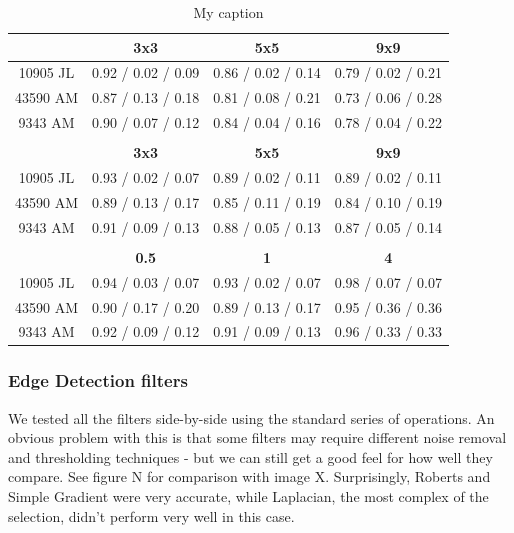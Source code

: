 \documentclass[10pt,a4paper]{article}
\begin{document}
\begin{table}[]
\centering
\caption{My caption}
\label{my-label}
\begin{tabular}{|c|c|c|c|}
\hline
\textbf{} & \textbf{3x3}       & \textbf{5x5}       & \textbf{9x9}       \\ \hline
10905 JL  & 0.92 / 0.02 / 0.09 & 0.86 / 0.02 / 0.14 & 0.79 / 0.02 / 0.21 \\ \hline
43590 AM  & 0.87 / 0.13 / 0.18 & 0.81 / 0.08 / 0.21 & 0.73 / 0.06 / 0.28 \\ \hline
9343 AM   & 0.90 / 0.07 / 0.12 & 0.84 / 0.04 / 0.16 & 0.78 / 0.04 / 0.22 \\ \hline
          &                    &                    &                    \\ \hline
          & \textbf{3x3}       & \textbf{5x5}       & \textbf{9x9}       \\ \hline
10905 JL  & 0.93 / 0.02 / 0.07 & 0.89 / 0.02 / 0.11 & 0.89 / 0.02 / 0.11 \\ \hline
43590 AM  & 0.89 / 0.13 / 0.17 & 0.85 / 0.11 / 0.19 & 0.84 / 0.10 / 0.19 \\ \hline
9343 AM   & 0.91 / 0.09 / 0.13 & 0.88 / 0.05 / 0.13 & 0.87 / 0.05 / 0.14 \\ \hline
          &                    &                    &                    \\ \hline
          & \textbf{0.5}       & \textbf{1}         & \textbf{4}         \\ \hline
10905 JL  & 0.94 / 0.03 / 0.07 & 0.93 / 0.02 / 0.07 & 0.98 / 0.07 / 0.07 \\ \hline
43590 AM  & 0.90 / 0.17 / 0.20 & 0.89 / 0.13 / 0.17 & 0.95 / 0.36 / 0.36 \\ \hline
9343 AM   & 0.92 / 0.09 / 0.12 & 0.91 / 0.09 / 0.13 & 0.96 / 0.33 / 0.33 \\ \hline
\end{tabular}
\end{table}


\subsubsection*{Edge Detection filters}
We tested all the filters side-by-side using the standard series of operations. An obvious problem with this is that some filters may require different noise removal and thresholding techniques - but we can still get a good feel for how well they compare. See figure N for comparison with image X. Surprisingly, Roberts and Simple Gradient were very accurate, while Laplacian, the most complex of the selection, didn’t perform very well in this case.
\end{document}

